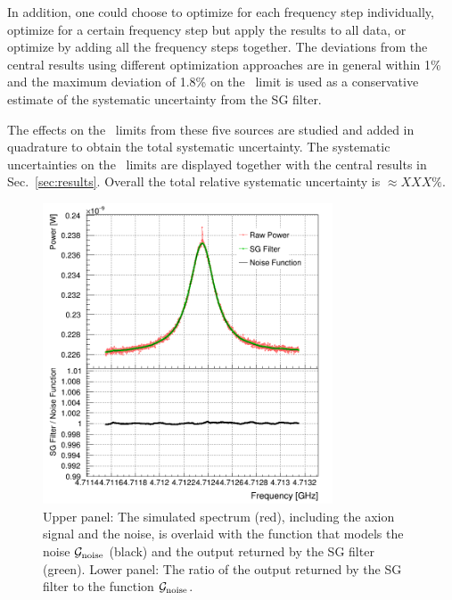 \begin{itemize}
In addition, one could choose to optimize for each frequency step 
individually, optimize for a certain frequency step but apply the results to 
all data, or optimize by adding all the frequency steps together. 
The deviations from the central results using different optimization 
approaches are in general within 1\% and the 
maximum deviation of 1.8\% 
on the \gagg\ limit is used as a conservative estimate of the systematic 
uncertainty from the SG filter. 

\end{itemize}

The effects on the \gagg\ limits from these five sources are studied and added in 
quadrature to obtain the total systematic uncertainty. 
The systematic uncertainties on the \gagg\ limits 
are displayed together with the central results in Sec.~\ref{sec:results}. 
Overall the total relative systematic uncertainty is $\approx XXX\%$.

\begin{figure} [htbp]
  \centering
  \includegraphics[width=8.6cm]{figures/GeneratedSpectrum_Optimized_SGFilter_NPar_3_Window_141.png}
  \caption{Upper panel: 
 The simulated spectrum (red), including the axion signal and the 
noise, is overlaid with the function that models the noise 
${\cal G}_\text{noise}$ (black) and the 
output returned by the SG filter (green). Lower panel: The ratio of the output 
returned by the SG filter to the function ${\cal G}_\text{noise}$.}
  \label{fig:sgcompare}
\end{figure}


